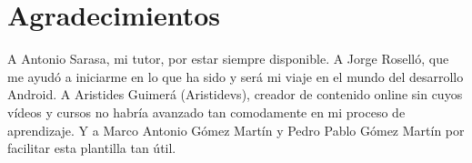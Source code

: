 
\chapter*{Agradecimientos}

A Antonio Sarasa, mi tutor, por estar siempre disponible. A Jorge Roselló, que me ayudó a iniciarme en lo que ha sido y será mi viaje en el mundo del desarrollo Android. A Aristides Guimerá (Aristidevs), creador de contenido online sin cuyos vídeos y cursos no habría avanzado tan comodamente en mi proceso de aprendizaje. Y a Marco Antonio Gómez Martín y Pedro Pablo Gómez Martín por facilitar esta plantilla tan útil.











